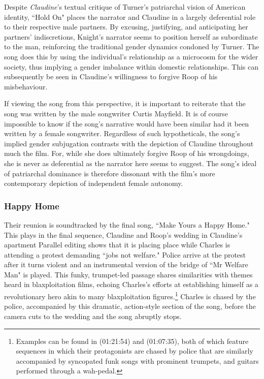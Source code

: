 Despite \textit{Claudine}'s textual critique of Turner's patriarchal vision of American identity, ``Hold On" places the narrator and Claudine in a largely deferential role to their respective male partners.
By excusing, justifying, and anticipating her partners' indiscretions, Knight's narrator seems to position herself as subordinate to the man, reinforcing the traditional gender dynamics condoned by Turner.
The song does this by using the individual's relationship as a microcosm for the wider society, thus implying a gender imbalance within domestic relationships.
This can subsequently be seen in Claudine's willingness to forgive Roop of his misbehaviour.

If viewing the song from this perspective, it is important to reiterate that the song was written by the male songwriter Curtis Mayfield.
It is of course impossible to know if the song's narrative would have been similar had it been written by a female songwriter.
Regardless of such hypotheticals, the song's implied gender subjugation contrasts with the depiction of Claudine throughout much the film.
For, while she does ultimately forgive Roop of his wrongdoings, she is never as deferential as the narrator here seems to suggest.
The song's ideal of patriarchal dominance is therefore dissonant with the film's more contemporary depiction of independent female autonomy.



\subsubsection{Happy Home}


Their reunion is soundtracked by the final song, ``Make Yours a Happy Home."
This plays in the final sequence, Claudine and Roop's wedding in Claudine's apartment
Parallel editing shows that it is placing place while Charles is attending a protest demanding ``jobs not welfare."
Police arrive at the protest after it turns violent and an instrumental version of the bridge of ``Mr Welfare Man" is played.
This funky, trumpet-led passage shares similarities with themes heard in blaxploitation films, echoing Charles's efforts at establishing himself as a revolutionary hero akin to many blaxploitation figures.\footnote{Examples can be found in \textcite{parks_super_1972} (01:21:54) and \textcite{moses_willie_1973} (01:07:35), both of which feature sequences in which their protagonists are chased by police that are similarly accompanied by syncopated funk songs with prominent trumpets, and guitars performed through a wah-pedal.}
Charles is chased by the police, accompanied by this dramatic, action-style section of the song, before the camera cuts to the wedding and the song abruptly stops.

